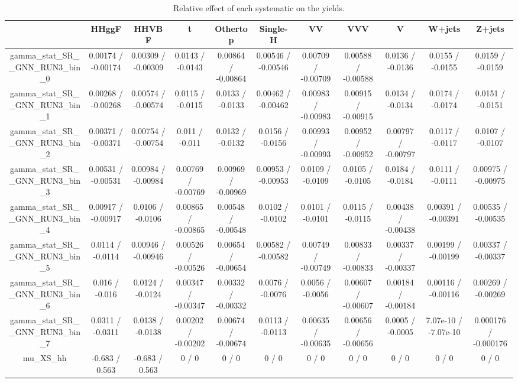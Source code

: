 \documentclass[10pt]{article}
\begin{document}
\begin{table}[htbp]
\begin{center}
\begin{tabular}{|c|c|c|c|c|c|c|c|c|c|c|}
\hline 
      & HHggF      & HHVBF      & t      & Othertop      & Single-H      & VV      & VVV      & V      & W+jets      & Z+jets \\ 
\hline 
  gamma_stat_SR__GNN_RUN3_bin_0 & 0.00174 / -0.00174 & 0.00309 / -0.00309 & 0.0143 / -0.0143 & 0.00864 / -0.00864 & 0.00546 / -0.00546 & 0.00709 / -0.00709 & 0.00588 / -0.00588 & 0.0136 / -0.0136 & 0.0155 / -0.0155 & 0.0159 / -0.0159 \\ 
  gamma_stat_SR__GNN_RUN3_bin_1 & 0.00268 / -0.00268 & 0.00574 / -0.00574 & 0.0115 / -0.0115 & 0.0133 / -0.0133 & 0.00462 / -0.00462 & 0.00983 / -0.00983 & 0.00915 / -0.00915 & 0.0134 / -0.0134 & 0.0174 / -0.0174 & 0.0151 / -0.0151 \\ 
  gamma_stat_SR__GNN_RUN3_bin_2 & 0.00371 / -0.00371 & 0.00754 / -0.00754 & 0.011 / -0.011 & 0.0132 / -0.0132 & 0.0156 / -0.0156 & 0.00993 / -0.00993 & 0.00952 / -0.00952 & 0.00797 / -0.00797 & 0.0117 / -0.0117 & 0.0107 / -0.0107 \\ 
  gamma_stat_SR__GNN_RUN3_bin_3 & 0.00531 / -0.00531 & 0.00984 / -0.00984 & 0.00769 / -0.00769 & 0.00969 / -0.00969 & 0.00953 / -0.00953 & 0.0109 / -0.0109 & 0.0105 / -0.0105 & 0.0184 / -0.0184 & 0.0111 / -0.0111 & 0.00975 / -0.00975 \\ 
  gamma_stat_SR__GNN_RUN3_bin_4 & 0.00917 / -0.00917 & 0.0106 / -0.0106 & 0.00865 / -0.00865 & 0.00548 / -0.00548 & 0.0102 / -0.0102 & 0.0101 / -0.0101 & 0.0115 / -0.0115 & 0.00438 / -0.00438 & 0.00391 / -0.00391 & 0.00535 / -0.00535 \\ 
  gamma_stat_SR__GNN_RUN3_bin_5 & 0.0114 / -0.0114 & 0.00946 / -0.00946 & 0.00526 / -0.00526 & 0.00654 / -0.00654 & 0.00582 / -0.00582 & 0.00749 / -0.00749 & 0.00833 / -0.00833 & 0.00337 / -0.00337 & 0.00199 / -0.00199 & 0.00337 / -0.00337 \\ 
  gamma_stat_SR__GNN_RUN3_bin_6 & 0.016 / -0.016 & 0.0124 / -0.0124 & 0.00347 / -0.00347 & 0.00332 / -0.00332 & 0.0076 / -0.0076 & 0.0056 / -0.0056 & 0.00607 / -0.00607 & 0.00184 / -0.00184 & 0.00116 / -0.00116 & 0.00269 / -0.00269 \\ 
  gamma_stat_SR__GNN_RUN3_bin_7 & 0.0311 / -0.0311 & 0.0138 / -0.0138 & 0.00202 / -0.00202 & 0.00674 / -0.00674 & 0.0113 / -0.0113 & 0.00635 / -0.00635 & 0.00656 / -0.00656 & 0.0005 / -0.0005 & 7.07e-10 / -7.07e-10 & 0.000176 / -0.000176 \\ 
  mu_XS_hh & -0.683 / 0.563 & -0.683 / 0.563 & 0 / 0 & 0 / 0 & 0 / 0 & 0 / 0 & 0 / 0 & 0 / 0 & 0 / 0 & 0 / 0 \\ 
\hline 
\end{tabular} 
\caption{Relative effect of each systematic on the yields.} 
\end{center} 
\end{table} 
\end{document}
